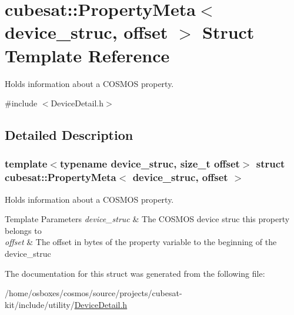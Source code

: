 \hypertarget{structcubesat_1_1PropertyMeta}{}\section{cubesat\+:\+:Property\+Meta$<$ device\+\_\+struc, offset $>$ Struct Template Reference}
\label{structcubesat_1_1PropertyMeta}


Holds information about a C\+O\+S\+M\+OS property.  




{\ttfamily \#include $<$Device\+Detail.\+h$>$}



\subsection{Detailed Description}
\subsubsection*{template$<$typename device\+\_\+struc, size\+\_\+t offset$>$\newline
struct cubesat\+::\+Property\+Meta$<$ device\+\_\+struc, offset $>$}

Holds information about a C\+O\+S\+M\+OS property. 


\begin{DoxyTemplParams}{Template Parameters}
{\em device\+\_\+struc} & The C\+O\+S\+M\+OS device struc this property belongs to \\
\hline
{\em offset} & The offset in bytes of the property variable to the beginning of the device\+\_\+struc \\
\hline
\end{DoxyTemplParams}


The documentation for this struct was generated from the following file\+:\begin{DoxyCompactItemize}
\item 
/home/osboxes/cosmos/source/projects/cubesat-\/kit/include/utility/\hyperlink{DeviceDetail_8h}{Device\+Detail.\+h}\end{DoxyCompactItemize}
